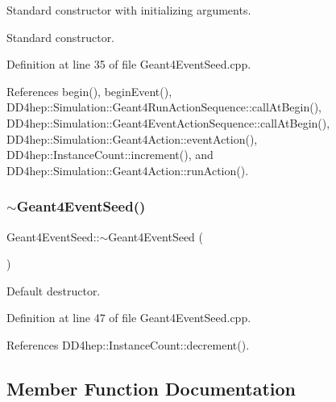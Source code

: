 Standard constructor with initializing arguments. 

Standard constructor. 

Definition at line 35 of file Geant4\+Event\+Seed.\+cpp.



References begin(), begin\+Event(), D\+D4hep\+::\+Simulation\+::\+Geant4\+Run\+Action\+Sequence\+::call\+At\+Begin(), D\+D4hep\+::\+Simulation\+::\+Geant4\+Event\+Action\+Sequence\+::call\+At\+Begin(), D\+D4hep\+::\+Simulation\+::\+Geant4\+Action\+::event\+Action(), D\+D4hep\+::\+Instance\+Count\+::increment(), and D\+D4hep\+::\+Simulation\+::\+Geant4\+Action\+::run\+Action().

\hypertarget{class_d_d4hep_1_1_simulation_1_1_geant4_event_seed_aa5a136f12e95432a45ca2eef0c1b6856}{}\label{class_d_d4hep_1_1_simulation_1_1_geant4_event_seed_aa5a136f12e95432a45ca2eef0c1b6856} 
\subsubsection{\texorpdfstring{$\sim$\+Geant4\+Event\+Seed()}{~Geant4EventSeed()}}
{\footnotesize\ttfamily Geant4\+Event\+Seed\+::$\sim$\+Geant4\+Event\+Seed (\begin{DoxyParamCaption}{ }\end{DoxyParamCaption})\hspace{0.3cm}{\ttfamily [virtual]}}



Default destructor. 



Definition at line 47 of file Geant4\+Event\+Seed.\+cpp.



References D\+D4hep\+::\+Instance\+Count\+::decrement().



\subsection{Member Function Documentation}
\hypertarget{class_d_d4hep_1_1_simulation_1_1_geant4_event_seed_a297ed6d4c7366df16c151f31bee46028}{}\label{class_d_d4hep_1_1_simulation_1_1_geant4_event_seed_a297ed6d4c7366df16c151f31bee46028} 
